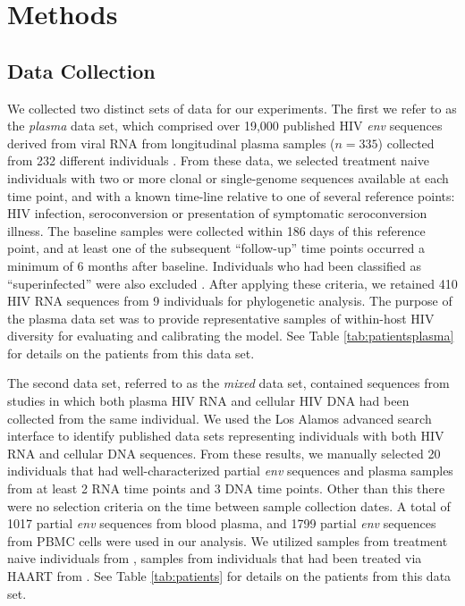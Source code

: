 \documentclass[12pt]{article}
\begin{document}

\section * {Methods} \label{sec:methods}



\subsection * {Data Collection} \label{subsec:dcollection}
We collected two distinct sets of data for our experiments. 
The first we refer to as the {\em plasma} data set, which comprised over 19,000 published HIV \textit{env} sequences derived from viral RNA from longitudinal plasma samples ($n=335$) collected from 232 different individuals \citep{McCloskey14}. 
From these data, we selected treatment naive individuals with two or more clonal or single-genome sequences available at each time point, and with a known time-line relative to one of several reference points: HIV infection, seroconversion or presentation of symptomatic seroconversion illness. 
The baseline samples were collected within 186 days of this reference point, and at least one of the subsequent ``follow-up'' time points occurred a minimum of 6 months after baseline.
Individuals who had been classified as ``superinfected'' were also excluded \citep{McCloskey14}.
After applying these criteria, we retained 410 HIV RNA sequences from 9 individuals for phylogenetic analysis.
The purpose of the plasma data set was to provide representative samples of within-host HIV diversity for evaluating and calibrating the model.
See Table \ref{tab:patientsplasma} for details on the patients from this data set.

The second data set, referred to as the {\em mixed} data set, contained sequences from studies in which both plasma HIV RNA and cellular HIV DNA had been collected from the same individual.
We used the Los Alamos advanced search interface \citep{LosAlamos} to identify published data sets representing individuals with both HIV RNA and cellular DNA sequences.
From these results, we manually selected 20 individuals that had well-characterized partial {\em env} sequences and plasma samples from at least 2 RNA time points and 3 DNA time points. 
Other than this there were no selection criteria on the time between sample collection dates. 
A total of 1017 partial {\em env} sequences from blood plasma, and 1799 partial {\em env} sequences from PBMC cells were used in our analysis. 
We utilized samples from treatment naive individuals from \cite{Shankarappa99, Novitsky09}, samples from individuals that had been treated via HAART from \cite{Llewellyn06}.
See Table \ref{tab:patients} for details on the patients from this data set.
\end{document}
